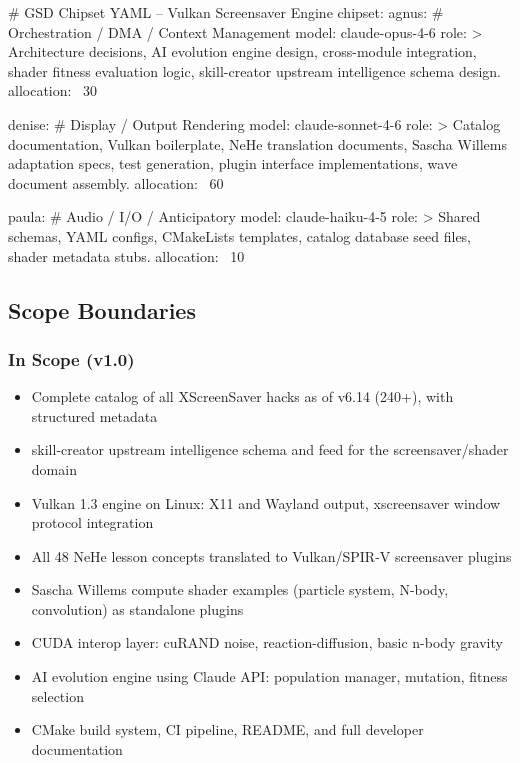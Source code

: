 \documentclass[11pt,letterpaper]{article}
\begin{document}
\begin{asciibox}
# GSD Chipset YAML -- Vulkan Screensaver Engine
chipset:
  agnus:                    # Orchestration / DMA / Context Management
    model: claude-opus-4-6
    role: >
      Architecture decisions, AI evolution engine design,
      cross-module integration, shader fitness evaluation logic,
      skill-creator upstream intelligence schema design.
    allocation: ~30%

  denise:                   # Display / Output Rendering
    model: claude-sonnet-4-6
    role: >
      Catalog documentation, Vulkan boilerplate, NeHe translation
      documents, Sascha Willems adaptation specs, test generation,
      plugin interface implementations, wave document assembly.
    allocation: ~60%

  paula:                    # Audio / I/O / Anticipatory
    model: claude-haiku-4-5
    role: >
      Shared schemas, YAML configs, CMakeLists templates,
      catalog database seed files, shader metadata stubs.
    allocation: ~10%
\end{asciibox}

\subsection{Scope Boundaries}

\subsubsection{In Scope (v1.0)}

\begin{itemize}
\item Complete catalog of all XScreenSaver hacks as of v6.14 (240+), with structured metadata
\item skill-creator upstream intelligence schema and feed for the screensaver/shader domain
\item Vulkan 1.3 engine on Linux: X11 and Wayland output, xscreensaver window protocol integration
\item All 48 NeHe lesson concepts translated to Vulkan/SPIR-V screensaver plugins
\item Sascha Willems compute shader examples (particle system, N-body, convolution) as standalone plugins
\item CUDA interop layer: cuRAND noise, reaction-diffusion, basic n-body gravity
\item AI evolution engine using Claude API: population manager, mutation, fitness selection
\item CMake build system, CI pipeline, README, and full developer documentation
\end{itemize}
\end{document}
